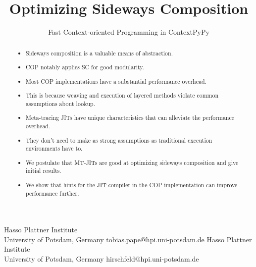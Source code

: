 \documentclass[preprint,english,10pt,nonatbib]{sigplanconf}
\begin{document}



\title{Optimizing Sideways Composition}
\subtitle{Fast Context-oriented Programming in ContextPyPy}

           {Hasso Plattner Institute\\ University of Potsdam, Germany}
           {tobias.pape@hpi.uni-potsdam.de}
           {Hasso Plattner Institute\\ University of Potsdam, Germany}
           {hirschfeld@hpi.uni-potsdam.de}

\maketitle

\begin{abstract}
  \begin{itemize}
  \item Sideways composition is a valuable means of abstraction.
  \item COP notably applies SC for good modularity.
  \item Most COP implementations have a substantial performance overhead.
  \item This is because weaving and execution of layered methods violate common
    assumptions about lookup.
  \item Meta-tracing JITs have unique characteristics that can alleviate the
    performance overhead.
  \item They don't need to make as strong assumptions as traditional execution
    environments have to.
  \item We postulate that MT-JITs are good at optimizing sideways composition
    and give initial results.
  \item We show that hints for the JIT compiler in the COP implementation can
    improve performance further.
  \end{itemize}
\end{abstract}
\end{document}
